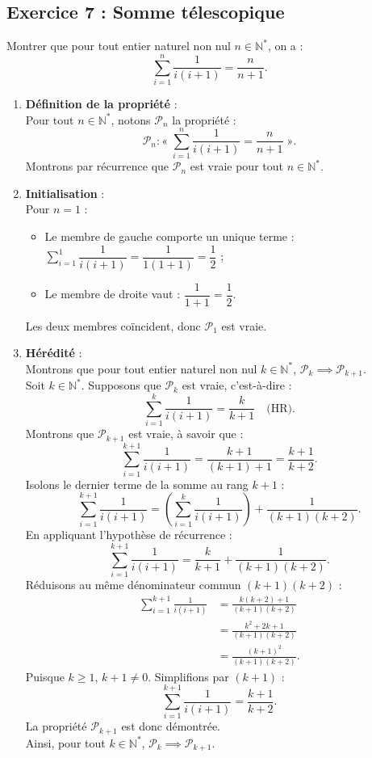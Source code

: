 \documentclass[11pt,a4paper]{article}
\newcommand{\N}{\mathbb{N}}
\begin{document}
\subsection*{Exercice 7 : Somme télescopique}

Montrer que pour tout entier naturel non nul $n \in \N^*$, on a :
\[
\sum_{i=1}^n \frac{1}{i(i+1)} = \frac{n}{n+1}.
\]

\begin{correctionbox}
\begin{enumerate}[label=\textbf{\arabic*.}]
    \item \textbf{Définition de la propriété} :\\
    Pour tout $n \in \N^*$, notons $\mathcal{P}_n$ la propriété :
    \[
    \mathcal{P}_n : « \; \sum_{i=1}^n \frac{1}{i(i+1)} = \frac{n}{n+1} \; ».
    \]
    Montrons par récurrence que $\mathcal{P}_n$ est vraie pour tout $n \in \N^*$.

    \item \textbf{Initialisation} :\\
    Pour $n = 1$ :
    \begin{itemize}
        \item Le membre de gauche comporte un unique terme : $\sum_{i=1}^1 \dfrac{1}{i(i+1)} = \dfrac{1}{1(1+1)} = \dfrac{1}{2}$ ;
        \item Le membre de droite vaut : $\dfrac{1}{1+1} = \dfrac{1}{2}$.
    \end{itemize}
    Les deux membres coïncident, donc $\mathcal{P}_1$ est vraie.

    \item \textbf{Hérédité} :\\
    Montrons que pour tout entier naturel non nul $k \in \N^*$, $\mathcal{P}_k \implies \mathcal{P}_{k+1}$.\\
    Soit $k \in \N^*$. Supposons que $\mathcal{P}_k$ est vraie, c'est-à-dire :
    \[
    \sum_{i=1}^k \frac{1}{i(i+1)} = \frac{k}{k+1} \quad \text{(HR)}.
    \]
    Montrons que $\mathcal{P}_{k+1}$ est vraie, à savoir que :
    \[
    \sum_{i=1}^{k+1} \frac{1}{i(i+1)} = \frac{k+1}{(k+1)+1} = \frac{k+1}{k+2}.
    \]
    Isolons le dernier terme de la somme au rang $k+1$ :
    \[
    \sum_{i=1}^{k+1} \frac{1}{i(i+1)} = \left(\sum_{i=1}^k \frac{1}{i(i+1)}\right) + \frac{1}{(k+1)(k+2)}.
    \]
    En appliquant l'hypothèse de récurrence :
    \[
    \sum_{i=1}^{k+1} \frac{1}{i(i+1)} = \frac{k}{k+1} + \frac{1}{(k+1)(k+2)}.
    \]
    Réduisons au même dénominateur commun $(k+1)(k+2)$ :
    \begin{align*}
    \sum_{i=1}^{k+1} \frac{1}{i(i+1)} &= \frac{k(k+2) + 1}{(k+1)(k+2)} \\
                                     &= \frac{k^2 + 2k + 1}{(k+1)(k+2)} \\
                                     &= \frac{(k+1)^2}{(k+1)(k+2)}.
    \end{align*}
    Puisque $k \ge 1$, $k+1 \neq 0$. Simplifions par $(k+1)$ :
    \[
    \sum_{i=1}^{k+1} \frac{1}{i(i+1)} = \frac{k+1}{k+2}.
    \]
    La propriété $\mathcal{P}_{k+1}$ est donc démontrée.\\
    Ainsi, pour tout $k \in \N^*$, $\mathcal{P}_k \implies \mathcal{P}_{k+1}$.


\end{enumerate}
\end{correctionbox}
\end{document}

